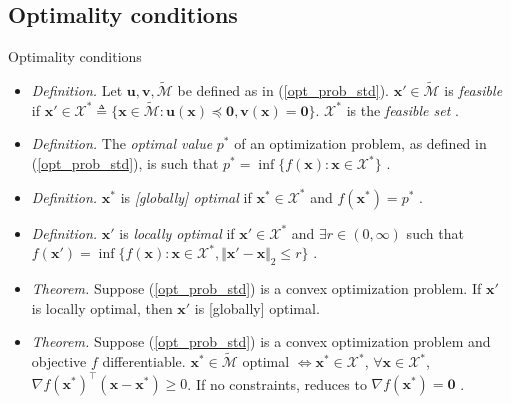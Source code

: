 \documentclass{beamer}
\numberwithin{equation}{section}
\newcommand{\aref}[1]{\alert{\ref{#1}}}
\begin{document}
\subsection{Optimality conditions}

\begin{frame}{Optimality conditions}
    \begin{itemize}
        \item
        \textit{Definition.} Let $ \mathbf{u}, \mathbf{v},
        \tilde{\mathcal{M}} $ be defined as in (\aref{opt_prob_std}).
        $ \mathbf{x}' \in \tilde{\mathcal{M}} $ is \textit{feasible} if
        $ \mathbf{x}' \in \mathcal{X}^*
        \triangleq \{\mathbf{x} \in \tilde{\mathcal{M}} :
        \mathbf{u}(\mathbf{x}) \preceq \mathbf{0}, \mathbf{v}(\mathbf{x}) =
        \mathbf{0}\} $. $ \mathcal{X}^* $ is the \textit{feasible set}
        \cite{bv_convex_opt}.

        \item
        \textit{Definition.} The \textit{optimal value} $ p^* $
        of an optimization problem, as defined in (\aref{opt_prob_std}), is
        such that $ p^* = \inf\{f(\mathbf{x}) : \mathbf{x} \in
        \mathcal{X}^*\} $ \cite{bv_convex_opt}.

        \item
        \textit{Definition.} $ \mathbf{x}^* $ is \textit{[globally] optimal}
        if $ \mathbf{x}^* \in \mathcal{X}^* $ and $ f(\mathbf{x}^*) = p^* $ 
        \cite{bv_convex_opt}.

        \item
        \textit{Definition.} $ \mathbf{x}' $ is \textit{locally optimal} if
        $ \mathbf{x}' \in \mathcal{X}^* $ and $ \exists r \in (0, \infty) $
        such that $ f(\mathbf{x}') = \inf\{
            f(\mathbf{x}) : \mathbf{x} \in \mathcal{X}^*,
            \Vert\mathbf{x}' - \mathbf{x}\Vert_2 \le r
        \}$ \cite{bv_convex_opt}.

        \item
        \textit{Theorem.} Suppose (\aref{opt_prob_std}) is a \alert{convex}
        optimization problem. If $ \mathbf{x}' $ is locally optimal, then
        $ \mathbf{x}' $ is [globally] optimal.

        \item
        \textit{Theorem.} Suppose (\aref{opt_prob_std}) is a \alert{convex}
        optimization problem and objective $ f $ differentiable.
        $ \mathbf{x}^* \in \tilde{\mathcal{M}} $ optimal
        $ \Leftrightarrow \mathbf{x}^* \in \mathcal{X}^* $,
        $ \forall \mathbf{x} \in \mathcal{X}^* $,
        $ \nabla f(\mathbf{x}^*)^\top(\mathbf{x} - \mathbf{x}^*) \ge 0 $.
        If no constraints, reduces to $ \nabla f(\mathbf{x}^*) = \mathbf{0} $
        \cite{bv_convex_opt}.
    \end{itemize}
\end{frame}
\end{document}
